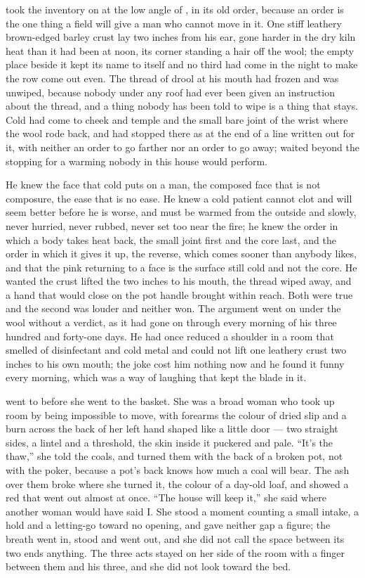  took the inventory on  at the low angle of , in its old order, because an order is the one thing a field will give a man who cannot move in it. One stiff leathery brown-edged barley crust lay two inches from his ear, gone harder in the dry kiln heat than it had been at noon, its corner standing a hair off the wool; the empty place beside it kept its name to itself and no third had come in the night to make the row come out even. The thread of drool at his mouth had frozen and was unwiped, because nobody under any roof had ever been given an instruction about the thread, and a thing nobody has been told to wipe is a thing that stays. Cold had come to cheek and temple and the small bare joint of the wrist where the wool rode back, and had stopped there as at the end of a line written out for it, with neither an order to go farther nor an order to go away;  waited beyond the stopping for a warming nobody in this house would perform.

He knew the face that cold puts on a man, the composed face that is not composure, the ease that is no ease. He knew a cold patient cannot clot and will seem better before he is worse, and must be warmed from the outside and slowly, never hurried, never rubbed, never set too near the fire; he knew the order in which a body takes heat back, the small joint first and the core last, and the order in which it gives it up, the reverse, which comes sooner than anybody likes, and that the pink returning to a face is the surface still cold and not the core. He wanted the crust lifted the two inches to his mouth, the thread wiped away, and a hand that would close on the pot handle brought within reach. Both were true and the second was louder and neither won. The argument went on under the wool without a verdict, as it had gone on through every morning of his three hundred and forty-one days. He had once reduced a shoulder in a room that smelled of disinfectant and cold metal and could not lift one leathery crust two inches to his own mouth; the joke cost him nothing now and he found it funny every morning, which was a way of laughing that kept the blade in it.

 went to  before she went to the basket. She was a broad woman who took up room by being impossible to move, with forearms the colour of dried slip and a burn across the back of her left hand shaped like a little door --- two straight sides, a lintel and a threshold, the skin inside it puckered and pale. “It's the thaw,” she told the coals, and turned them with the back of a broken pot, not with the poker, because a pot's back knows how much a coal will bear. The ash over them broke where she turned it, the colour of a day-old loaf, and showed a red that went out almost at once. “The house will keep it,” she said where another woman would have said I. She stood a moment counting a small intake, a hold and a letting-go toward no opening, and gave neither gap a figure; the breath went in, stood and went out, and she did not call the space between its two ends anything. The three acts stayed on her side of the room with a finger between them and his three, and she did not look toward the bed.

